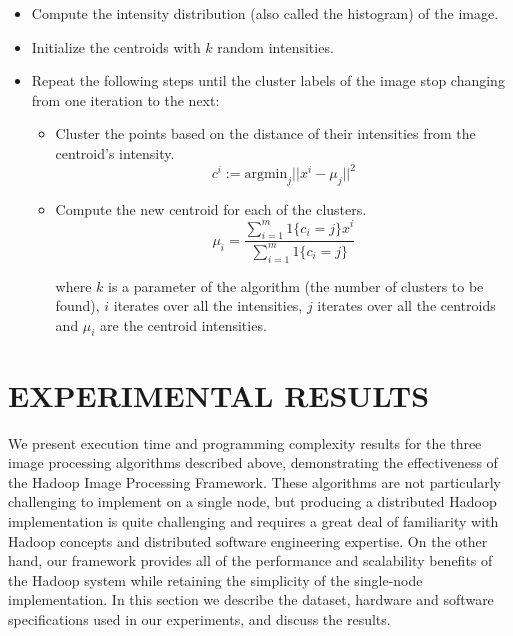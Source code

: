 				\begin{itemize}
					\item Compute the intensity distribution (also called the
					histogram) of the image.
					\item Initialize the centroids with $k$ random intensities.
					\item Repeat the following steps until the cluster labels of
					the image stop changing from one iteration to the next:
					\begin{itemize}
						\item Cluster the points based on the distance of their intensities
						from the centroid's intensity.
						\begin{equation}
						c^{i} := \mbox{argmin}_{j}||x^{i} - \mu_{j}||^2
						\end{equation}
						\item Compute the new centroid for each of the clusters.
						\begin{equation}
						\mu_{i} = \frac{\sum\limits_{i=1}^{m} 1\{c_{i} = j\}x^i}{\sum\limits_{i=1}^{m} 1\{c_{i} = j\}}
						\end{equation}
						
						where \begin{math}k\end{math} is a parameter of the algorithm
						(the number of clusters to be
						found), \begin{math}i\end{math} iterates over all the
						intensities, \begin{math}j\end{math} iterates over all the
						centroids and \begin{math}\mu_{i}\end{math} are the
						centroid intensities.
						\end{itemize}
						\end{itemize}


\chapter{EXPERIMENTAL RESULTS}
We present execution time and programming complexity results for the
three image processing algorithms described above, demonstrating the
effectiveness of the Hadoop Image Processing Framework.  These
algorithms are not particularly challenging to implement on a single
node, but producing a distributed Hadoop implementation is quite
challenging and requires a great deal of familiarity with Hadoop
concepts and distributed software engineering expertise.  On the other
hand, our framework provides all of the performance and scalability
benefits of the Hadoop system while retaining the simplicity of the
single-node implementation.  In this section we describe the dataset, 
hardware and software specifications used in our experiments, and
discuss the results.

